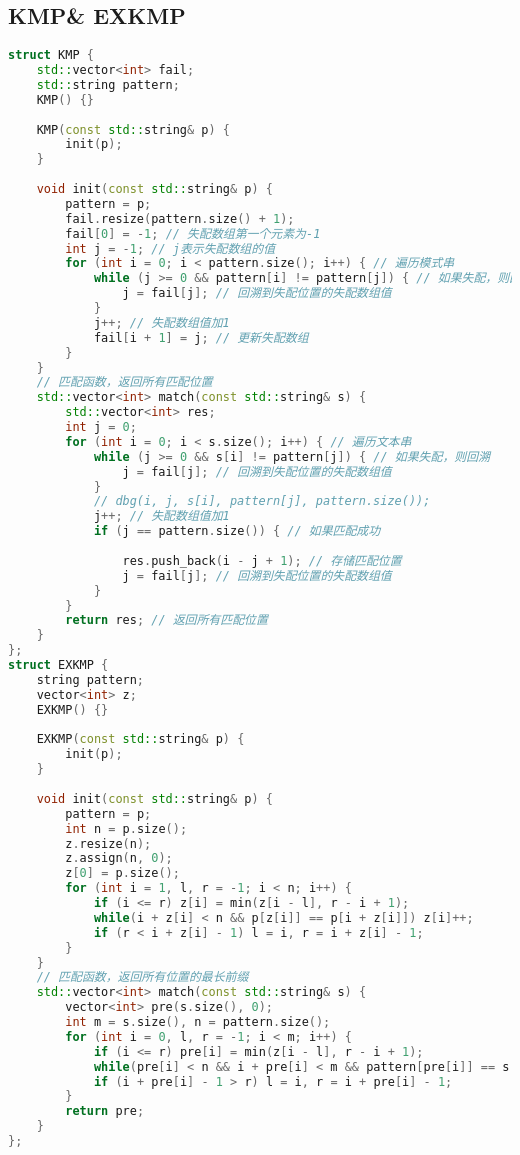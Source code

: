\subsection{KMP\& EXKMP}
\begin{lstlisting}[language=c++]
struct KMP {
    std::vector<int> fail; 
    std::string pattern; 
    KMP() {} 
    
    KMP(const std::string& p) {
        init(p);
    }
    
    void init(const std::string& p) {
        pattern = p; 
        fail.resize(pattern.size() + 1); 
        fail[0] = -1; // 失配数组第一个元素为-1
        int j = -1; // j表示失配数组的值
        for (int i = 0; i < pattern.size(); i++) { // 遍历模式串
            while (j >= 0 && pattern[i] != pattern[j]) { // 如果失配，则回溯
                j = fail[j]; // 回溯到失配位置的失配数组值
            }
            j++; // 失配数组值加1
            fail[i + 1] = j; // 更新失配数组
        }
    }
    // 匹配函数，返回所有匹配位置
    std::vector<int> match(const std::string& s) {
        std::vector<int> res; 
        int j = 0; 
        for (int i = 0; i < s.size(); i++) { // 遍历文本串
            while (j >= 0 && s[i] != pattern[j]) { // 如果失配，则回溯
                j = fail[j]; // 回溯到失配位置的失配数组值
            }
            // dbg(i, j, s[i], pattern[j], pattern.size());
            j++; // 失配数组值加1
            if (j == pattern.size()) { // 如果匹配成功
            	
                res.push_back(i - j + 1); // 存储匹配位置
                j = fail[j]; // 回溯到失配位置的失配数组值
            }
        }
        return res; // 返回所有匹配位置
    }
};
struct EXKMP {
    string pattern;
    vector<int> z;
    EXKMP() {} 
    
    EXKMP(const std::string& p) {
        init(p);
    }
    
    void init(const std::string& p) {
        pattern = p;
        int n = p.size();
        z.resize(n);
        z.assign(n, 0);
        z[0] = p.size();
        for (int i = 1, l, r = -1; i < n; i++) {
            if (i <= r) z[i] = min(z[i - l], r - i + 1);
            while(i + z[i] < n && p[z[i]] == p[i + z[i]]) z[i]++;
            if (r < i + z[i] - 1) l = i, r = i + z[i] - 1;
        }
    }
    // 匹配函数，返回所有位置的最长前缀
    std::vector<int> match(const std::string& s) {
        vector<int> pre(s.size(), 0);
        int m = s.size(), n = pattern.size();
        for (int i = 0, l, r = -1; i < m; i++) {
            if (i <= r) pre[i] = min(z[i - l], r - i + 1);
            while(pre[i] < n && i + pre[i] < m && pattern[pre[i]] == s[i + pre[i]]) pre[i]++;
            if (i + pre[i] - 1 > r) l = i, r = i + pre[i] - 1;
        }
        return pre;
    }
};
\end{lstlisting}
